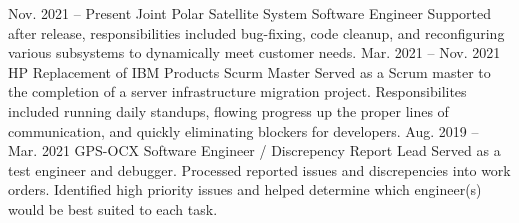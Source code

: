 \documentclass[8pt]{resumeclass}
\begin{document}
\begin{entrylist}
	\entry
		{Nov. 2021 -- Present}
		{Joint Polar Satellite System}
		{Software Engineer}
		{Supported after release, responsibilities included bug-fixing, code cleanup, and reconfiguring various subsystems to dynamically meet customer needs.}
	\entry
		{Mar. 2021 -- Nov. 2021}
		{HP Replacement of IBM Products}
		{Scurm Master}
		{Served as a Scrum master to the completion of a server infrastructure migration project. Responsibilites included running daily standups, flowing progress up the proper lines of communication, and quickly eliminating blockers for developers.}
	\entry
		{Aug. 2019 -- Mar. 2021}
		{GPS-OCX}
		{Software Engineer / Discrepency Report Lead}
		{Served as a test engineer and debugger. Processed reported issues and discrepencies into work orders. Identified high priority issues and helped determine which engineer(s) would be best suited to each task.}
\end{entrylist}


\end{document}

